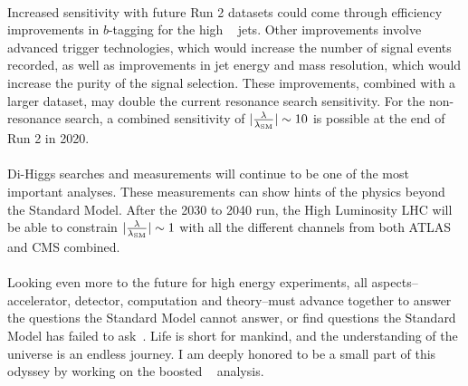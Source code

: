 \paragraph{}
Increased sensitivity with future Run 2 datasets could come through efficiency improvements in $b$-tagging for the high \pt~ jets.
Other improvements involve advanced trigger technologies, which would increase the number of signal events recorded, as well as improvements in jet energy and mass resolution, which would increase the purity of the signal selection.
These improvements, combined with a larger dataset, may double the current resonance search sensitivity. 
For the non-resonance search, a combined sensitivity of $|\frac{\rm\lambda}{\rm\lambda_{SM}}| \sim 10$ is possible at the end of Run 2 in 2020.

\paragraph{}
Di-Higgs searches and measurements will continue to be one of the most important analyses. 
These measurements can show hints of the physics beyond the Standard Model. 
After the 2030 to 2040 run, the High Luminosity LHC will be able to constrain $|\frac{\rm\lambda}{\rm\lambda_{SM}}| \sim 1$ with all the different channels from both ATLAS and CMS combined. 

\paragraph{}
Looking even more to the future for high energy experiments, all aspects--accelerator, detector, computation and theory--must advance together to answer the questions the Standard Model cannot answer, or find questions the Standard Model has failed to ask~\cite{Richter:2014pga, Hawking:2018tcn}. 
Life is short for mankind, and the understanding of the universe is an endless journey. 
I am deeply honored to be a small part of this odyssey by working on the boosted \pptofourb~ analysis.
